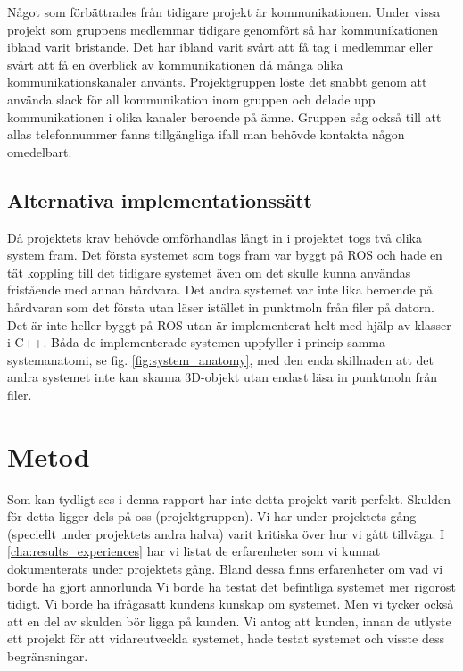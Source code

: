 Något som förbättrades från tidigare projekt är kommunikationen. Under vissa projekt som gruppens medlemmar tidigare genomfört så har kommunikationen ibland varit bristande. Det har ibland varit svårt att få tag i medlemmar eller svårt att få en överblick av kommunikationen då många olika kommunikationskanaler använts. Projektgruppen löste det snabbt genom att använda slack för all kommunikation inom gruppen och delade upp kommunikationen i olika kanaler beroende på ämne. Gruppen såg också till att allas telefonnummer fanns tillgängliga ifall man behövde kontakta någon omedelbart.

\subsection{Alternativa implementationssätt}
Då projektets krav behövde omförhandlas långt in i projektet togs två olika system fram. Det första systemet som togs fram var byggt på ROS och hade en tät koppling till det tidigare systemet även om det skulle kunna användas fristående med annan hårdvara. Det andra systemet var inte lika beroende på hårdvaran som det första utan läser istället in punktmoln från filer på datorn. Det är inte heller byggt på ROS utan är implementerat helt med hjälp av klasser i C++. Båda de implementerade systemen uppfyller i princip samma systemanatomi, se fig. \ref{fig:system_anatomy}, med den enda skillnaden att det andra systemet inte kan skanna 3D-objekt utan endast läsa in punktmoln från filer.

\section{Metod}
\label{sec:discussion-method}
Som kan tydligt ses i denna rapport har inte detta projekt varit perfekt. Skulden för detta ligger dels på oss (projektgruppen). Vi har under projektets gång (speciellt under projektets andra halva) varit kritiska över hur vi gått tillväga. I \ref{cha:results_experiences} har vi listat de erfarenheter som vi kunnat dokumenterats under projektets gång. Bland dessa finns erfarenheter om vad vi borde ha gjort annorlunda Vi borde ha testat det befintliga systemet mer rigoröst tidigt. Vi borde ha ifrågasatt kundens kunskap om systemet. Men vi tycker också att en del av skulden bör ligga på kunden. Vi antog att kunden, innan de utlyste ett projekt för att vidareutveckla systemet, hade testat systemet och visste dess begränsningar.

